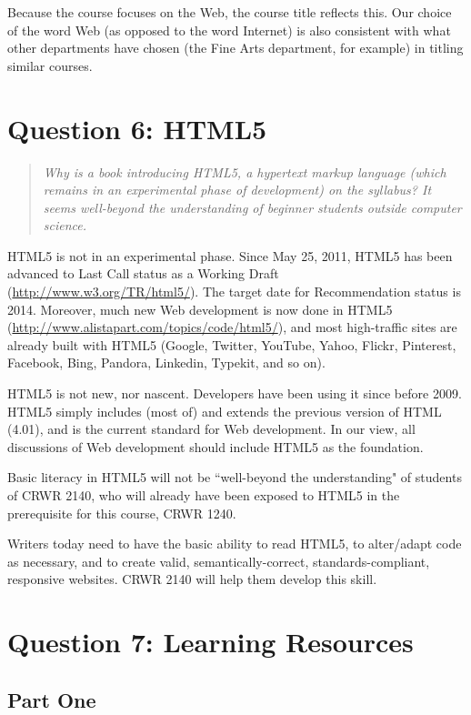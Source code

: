 \documentclass[letterpaper,10pt,headsepline]{scrreprt}
\begin{document}
Because the course focuses on the Web, the course title reflects this. Our choice of the word Web (as opposed to the word Internet) is also consistent with what other departments have chosen (the Fine Arts department, for example) in titling similar courses.

\section{Question 6: HTML5}

\begin{quote}
\textit{Why is a book introducing HTML5, a hypertext markup language (which remains in an experimental phase of development) on the syllabus? It seems well-beyond the understanding of beginner students outside computer science.}
\end{quote}

HTML5 is not in an experimental phase. Since May 25, 2011, HTML5 has been advanced to Last Call status as a Working Draft (\url{http://www.w3.org/TR/html5/}). The target date for Recommendation status is 2014. Moreover, much new Web development is now done in HTML5 (\url{http://www.alistapart.com/topics/code/html5/}), and most high-traffic sites are already built with HTML5 (Google, Twitter, YouTube, Yahoo, Flickr, Pinterest, Facebook, Bing, Pandora, Linkedin, Typekit, and so on).

HTML5 is not new, nor nascent. Developers have been using it since before 2009. HTML5 simply includes (most of) and extends the previous version of HTML (4.01), and is the current standard for Web development. In our view, all discussions of Web development should include HTML5 as the foundation.

Basic literacy in HTML5 will not be ``well-beyond the understanding" of students of CRWR 2140, who will already have been exposed to HTML5 in the prerequisite for this course, CRWR 1240.

Writers today need to have the basic ability to read HTML5, to alter/adapt code as necessary, and to create valid, semantically-correct, standards-compliant, responsive websites. CRWR 2140 will help them develop this skill.

\section{Question 7: Learning Resources}

\subsection{Part One}
\end{document}
